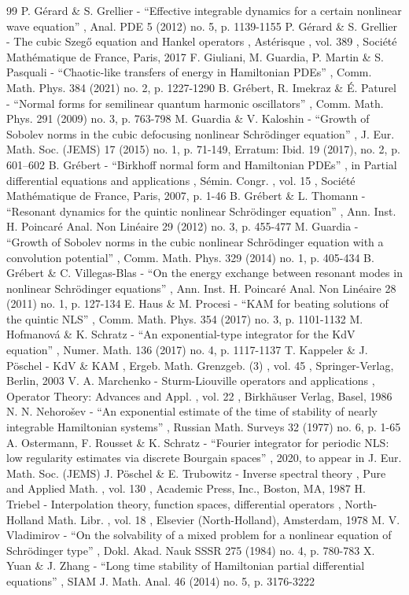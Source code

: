 \documentclass[11pt]{article}
\theoremstyle{definition}
\begin{document}
\begin{thebibliography}{99}
 P. Gérard \& S. Grellier - “Effective integrable dynamics for a certain nonlinear wave equation” , Anal. PDE 5 (2012) no. 5, p. 1139-1155
 P. Gérard \& S. Grellier - The cubic Szegő equation and Hankel operators , Astérisque , vol. 389 , Société Mathématique de France, Paris, 2017
 F. Giuliani, M. Guardia, P. Martin \& S. Pasquali - “Chaotic-like transfers of energy in Hamiltonian PDEs” , Comm. Math. Phys. 384 (2021) no. 2, p. 1227-1290
 B. Grébert, R. Imekraz \& É. Paturel - “Normal forms for semilinear quantum harmonic oscillators” , Comm. Math. Phys. 291 (2009) no. 3, p. 763-798
 M. Guardia \& V. Kaloshin - “Growth of Sobolev norms in the cubic defocusing nonlinear Schrödinger equation” , J. Eur. Math. Soc. (JEMS) 17 (2015) no. 1, p. 71-149, Erratum: Ibid. 19 (2017), no. 2, p. 601–602
 B. Grébert - “Birkhoff normal form and Hamiltonian PDEs” , in Partial differential equations and applications , Sémin. Congr. , vol. 15 , Société Mathématique de France, Paris, 2007, p. 1-46
 B. Grébert \& L. Thomann - “Resonant dynamics for the quintic nonlinear Schrödinger equation” , Ann. Inst. H. Poincaré Anal. Non Linéaire 29 (2012) no. 3, p. 455-477
 M. Guardia - “Growth of Sobolev norms in the cubic nonlinear Schrödinger equation with a convolution potential” , Comm. Math. Phys. 329 (2014) no. 1, p. 405-434
 B. Grébert \& C. Villegas-Blas - “On the energy exchange between resonant modes in nonlinear Schrödinger equations” , Ann. Inst. H. Poincaré Anal. Non Linéaire 28 (2011) no. 1, p. 127-134
 E. Haus \& M. Procesi - “KAM for beating solutions of the quintic NLS” , Comm. Math. Phys. 354 (2017) no. 3, p. 1101-1132
 M. Hofmanová \& K. Schratz - “An exponential-type integrator for the KdV equation” , Numer. Math. 136 (2017) no. 4, p. 1117-1137
 T. Kappeler \& J. Pöschel - KdV \& KAM , Ergeb. Math. Grenzgeb. (3) , vol. 45 , Springer-Verlag, Berlin, 2003
 V. A. Marchenko - Sturm-Liouville operators and applications , Operator Theory: Advances and Appl. , vol. 22 , Birkhäuser Verlag, Basel, 1986
 N. N. Nehorošev - “An exponential estimate of the time of stability of nearly integrable Hamiltonian systems” , Russian Math. Surveys 32 (1977) no. 6, p. 1-65
 A. Ostermann, F. Rousset \& K. Schratz - “Fourier integrator for periodic NLS: low regularity estimates via discrete Bourgain spaces” , 2020, to appear in J. Eur. Math. Soc. (JEMS)
 J. Pöschel \& E. Trubowitz - Inverse spectral theory , Pure and Applied Math. , vol. 130 , Academic Press, Inc., Boston, MA, 1987
 H. Triebel - Interpolation theory, function spaces, differential operators , North-Holland Math. Libr. , vol. 18 , Elsevier (North-Holland), Amsterdam, 1978
 M. V. Vladimirov - “On the solvability of a mixed problem for a nonlinear equation of Schrödinger type” , Dokl. Akad. Nauk SSSR 275 (1984) no. 4, p. 780-783
 X. Yuan \& J. Zhang - “Long time stability of Hamiltonian partial differential equations” , SIAM J. Math. Anal. 46 (2014) no. 5, p. 3176-3222
\end{thebibliography}
\end{document}
